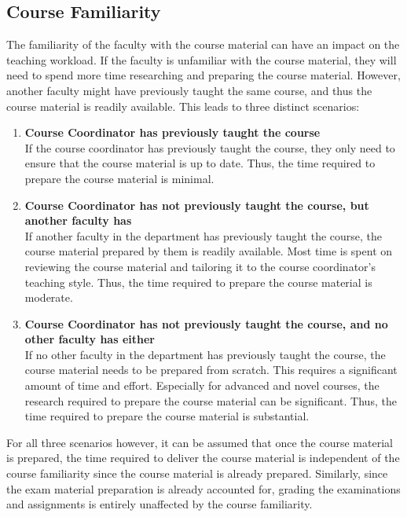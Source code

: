 \subsection{Course Familiarity}
\label{sec:course_familiarity}

The familiarity of the faculty with the course material can have an impact on the teaching workload. If the faculty is unfamiliar with the course material, they will need to spend more time researching and preparing the course material. However, another faculty might have previously taught the same course, and thus the course material is readily available. This leads to three distinct scenarios:

\begin{enumerate}
  \item \textbf{Course Coordinator has previously taught the course}\\
        If the course coordinator has previously taught the course, they only need to ensure that the course material is up to date. Thus, the time required to prepare the course material is minimal.
  \item \textbf{Course Coordinator has not previously taught the course, but another faculty has}\\
        If another faculty in the department has previously taught the course, the course material prepared by them is readily available. Most time is spent on reviewing the course material and tailoring it to the course coordinator's teaching style. Thus, the time required to prepare the course material is moderate.
  \item \textbf{Course Coordinator has not previously taught the course, and no other faculty has either}\\
        If no other faculty in the department has previously taught the course, the course material needs to be prepared from scratch. This requires a significant amount of time and effort. Especially for advanced and novel courses, the research required to prepare the course material can be significant. Thus, the time required to prepare the course material is substantial.
\end{enumerate}

For all three scenarios however, it can be assumed that once the course material is prepared, the time required to deliver the course material is independent of the course familiarity since the course material is already prepared. Similarly, since the exam material preparation is already accounted for, grading the examinations and assignments is entirely unaffected by the course familiarity.

